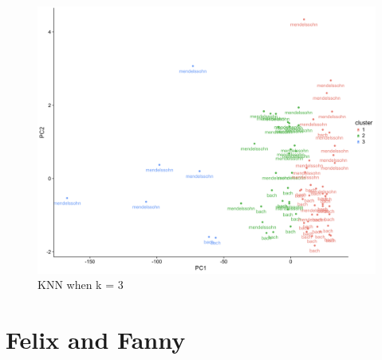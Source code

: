 \documentclass[12pt,twoside]{reedthesis}
\theoremstyle{definition}
\theoremstyle{definition}
\theoremstyle{definition}
\theoremstyle{remark}
\begin{document}
\begin{figure}[H]
\centering
\includegraphics[scale = .5]{images/k3.png}
\caption{KNN when k = 3}
\label{subd}
\end{figure}
\section{Felix and Fanny}\label{felix-and-fanny}
\end{document}
